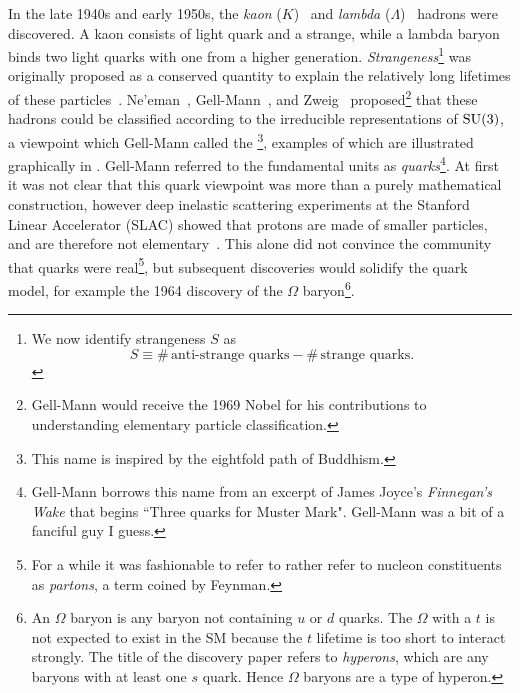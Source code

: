 In the late 1940s and early 1950s, the {\it kaon} ($K$)~\cite{rochester_evidence_1947}
 and {\it lambda} ($\Lambda$)~\cite{hopper_evidence_1950}
 hadrons were discovered. A kaon
consists of light quark and a strange, while a lambda baryon binds two light
quarks with one from a higher generation. {\it Strangeness}\footnote{We now 
identify strangeness $S$ as
$$
  S\equiv\#\,\text{anti-strange quarks}-\#\,\text{strange quarks}.
$$}
was originally proposed as a conserved quantity to explain the relatively long
lifetimes of these particles~\cite{pais_remarks_1952,gell-mann_isotopic_1953,
pais_baryon-meson-photon_1953,tadao_charge_1953}.
Ne'eman~\cite{neeman_derivation_1961},
Gell-Mann~\cite{gell-mann_symmetries_1962}, and
Zweig~\cite{zweig_su3_1964} proposed\footnote{Gell-Mann would receive the 1969
Nobel for his contributions to understanding elementary particle
classification.} that these hadrons could be classified
according to the irreducible representations of $\operatorname{SU}(3)$, a viewpoint which
Gell-Mann called the \footnote{This
name is inspired by the eightfold path of Buddhism.}, examples of which are
illustrated graphically in . Gell-Mann
referred to the fundamental units as {\it quarks}\footnote{Gell-Mann borrows
this name from an excerpt of James Joyce's {\it Finnegan's Wake} that begins
``Three quarks for Muster Mark".
Gell-Mann was a bit of a fanciful guy I guess.}.
At first it was not clear that this quark viewpoint was more than a
purely mathematical construction, however deep inelastic
scattering
experiments at the Stanford Linear Accelerator (SLAC) showed that
protons are made of smaller particles, and are therefore not
elementary~\cite{bloom_high-energy_1969,breidenbach_observed_1969}.
This alone did not convince the community that quarks were 
real\footnote{For a while it was fashionable to refer to rather refer to
nucleon constituents as {\it partons}, a term coined
by Feynman.}, but
subsequent discoveries would solidify the quark model,
for example the 1964 discovery\cite{barnes_observation_1964} 
of the 
$\Omega$ baryon\footnote{An $\Omega$ baryon is any baryon not
containing $u$ or $d$ quarks. The $\Omega$ with a $t$ is not expected
to exist in the SM because the $t$ lifetime is too short to
interact strongly. The title of the discovery paper refers 
to {\it hyperons}, which are any baryons with
at least one $s$ quark. Hence $\Omega$ baryons are a type of hyperon.}.

